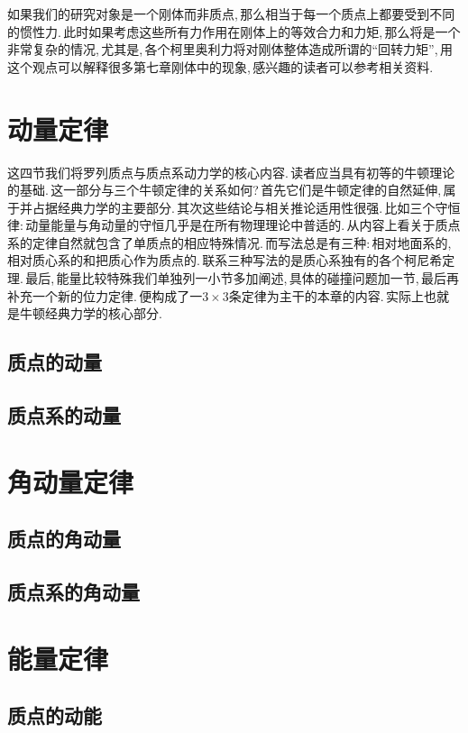 如果我们的研究对象是一个刚体而非质点,\,那么相当于每一个质点上都要受到不同的惯性力.\,此时如果考虑这些所有力作用在刚体上的等效合力和力矩,\,那么将是一个非常复杂的情况,\,尤其是,\,各个柯里奥利力将对刚体整体造成所谓的``回转力矩'',\,用这个观点可以解释很多第七章刚体中的现象,\,感兴趣的读者可以参考相关资料.

\section{动量定律}
这四节我们将罗列质点与质点系动力学的核心内容.\,读者应当具有初等的牛顿理论的基础.\,这一部分与三个牛顿定律的关系如何?\,首先它们是牛顿定律的自然延伸,\,属于并占据经典力学的主要部分.\,其次这些结论与相关推论适用性很强.\,比如三个守恒律:\,动量能量与角动量的守恒几乎是在所有物理理论中普适的.\,从内容上看关于质点系的定律自然就包含了单质点的相应特殊情况.\,而写法总是有三种:\,相对地面系的,\,相对质心系的和把质心作为质点的.\,联系三种写法的是质心系独有的各个柯尼希定理.\,最后,\,能量比较特殊我们单独列一小节多加阐述,\,具体的碰撞问题加一节,\,最后再补充一个新的位力定律.\,便构成了一$3\times3$条定律为主干的本章的内容.\,实际上也就是牛顿经典力学的核心部分.

\subsection{质点的动量}

\subsection{质点系的动量}


\section{角动量定律}

\subsection{质点的角动量}

\subsection{质点系的角动量}


\section{能量定律}

\subsection{质点的动能}

